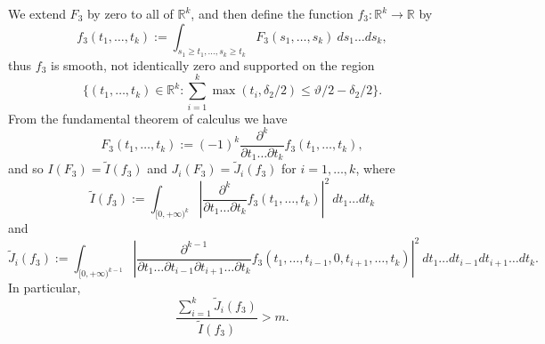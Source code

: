 \documentclass{bmcart}
\theoremstyle{plain}
\theoremstyle{definition}
\newcommand\R{\mathbb{R}}
\begin{document}
We extend $F_3$ by zero to all of $\R^k$, and then define the function $f_3: \R^k \to \R$ by
$$ f_3(t_1,\dots,t_k) := \int_{s_1 \geq t_1, \dots, s_k \geq t_k} F_3(s_1,\dots,s_k)\ ds_1 \dots ds_k,$$
thus $f_3$ is smooth, not identically zero and supported on the region
\begin{equation}\label{ftj-set}
 \{ (t_1,\dots,t_k) \in \R^k: \sum_{i=1}^k \max(t_i, \delta_2/2) \leq \vartheta/2 - \delta_2/2 \}.
\end{equation}
From the fundamental theorem of calculus we have
\begin{equation}\label{ftj}
 F_3(t_1,\dots,t_k) := (-1)^k \frac{\partial^k}{\partial t_1 \dots \partial t_k} f_3(t_1,\dots,t_k),
\end{equation}
and so $I(F_3) = \tilde I(f_3)$ and $J_i(F_3) = \tilde J_i(f_3)$ for $i=1,\dots,k$, where
\begin{equation}\label{tidef}
 \tilde I(f_3) := \int_{[0,+\infty)^k} \left|\frac{\partial^k}{\partial t_1 \dots \partial t_k} f_3(t_1,\dots,t_k)\right|^2\ dt_1 \dots dt_k
\end{equation}
and
\begin{equation}\label{tjdef}
 \tilde J_i(f_3) := \int_{[0,+\infty)^{k-1}} \left|\frac{\partial^{k-1}}{\partial t_1 \dots \partial t_{i-1} \partial t_{i+1} \dots \partial t_k} f_3(t_1,\dots,t_{i-1}, 0, t_{i+1}, \dots, t_k)\right|^2\ dt_1 \dots dt_{i-1} dt_{i+1} \dots dt_k.
\end{equation}
In particular, 
\begin{equation}\label{jbig-5}
 \frac{\sum_{i=1}^k \tilde J_i(f_3)}{\tilde I(f_3)} > m.
\end{equation}
\end{document}

